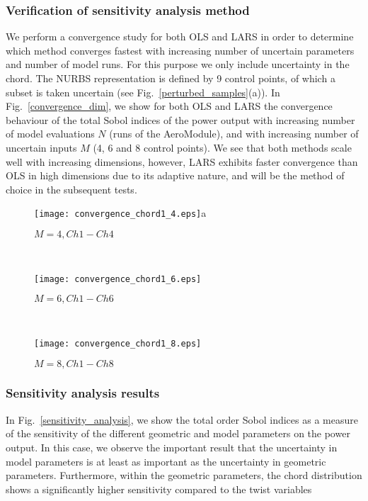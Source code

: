 \subsubsection{Verification of sensitivity analysis method}
We perform a convergence study for both OLS and LARS in order to determine which method converges fastest with increasing number of uncertain parameters and number of model runs. For this purpose we only include uncertainty in the chord. The NURBS representation is defined by 9 control points, of which a subset is taken uncertain (see Fig.\ \ref{perturbed_samples}(a)). In Fig.\ \ref{convergence_dim}, we show for both OLS and LARS the convergence behaviour of the total Sobol indices of the power output with increasing number of model evaluations $N$ (runs of the AeroModule), and with increasing number of uncertain inputs $M$ (4, 6 and 8 control points). We see that both methods scale well with increasing dimensions, however, LARS exhibits faster convergence than OLS in high dimensions due to its adaptive nature, and will be the method of choice in the subsequent tests. 

\begin{figure*}[h!]
    \centering
    \begin{subfigure}[t]{0.32\textwidth}
        \centering
        \texttt{[image: convergence\_chord1\_4.eps]}{a}
        \caption{$M=4, Ch1-Ch4$}
    \end{subfigure}%
    ~ 
    \begin{subfigure}[t]{0.32\textwidth}
        \centering
        \texttt{[image: convergence\_chord1\_6.eps]}
        \caption{$M=6, Ch1-Ch6$}
    \end{subfigure}
      ~ 
    \begin{subfigure}[t]{0.32\textwidth}
        \centering
        \texttt{[image: convergence\_chord1\_8.eps]}
        \caption{ $M=8, Ch1-Ch8$}
 \end{subfigure}
    \caption{Convergence of OLS and LARS with increasing number of uncertain inputs $M$ and model evaluations $N$.}
\label{convergence_dim}
\end{figure*}

\subsubsection{Sensitivity analysis results}
In Fig.~\ref{sensitivity_analysis}, we show the total order Sobol indices as a measure of the sensitivity of the different geometric and model parameters on the power output. In this case, we observe the important result that the uncertainty in model parameters is at least as important as the uncertainty in geometric parameters. Furthermore, within the geometric parameters, the chord distribution shows a significantly higher sensitivity compared to the twist variables

